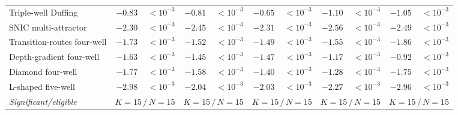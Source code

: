 \begin{tabular}{@{}l rr rr rr rr rr@{}}
Triple-well Duffing & $\mathbf{-0.83}$ & $<\!10^{-3}$ & $\mathbf{-0.81}$ & $<\!10^{-3}$ & $\mathbf{-0.65}$ & $<\!10^{-3}$ & $\mathbf{-1.10}$ & $<\!10^{-3}$ & $\mathbf{-1.05}$ & $<\!10^{-3}$ \\
SNIC multi-attractor & $\mathbf{-2.30}$ & $<\!10^{-3}$ & $\mathbf{-2.45}$ & $<\!10^{-3}$ & $\mathbf{-2.31}$ & $<\!10^{-3}$ & $\mathbf{-2.56}$ & $<\!10^{-3}$ & $\mathbf{-2.49}$ & $<\!10^{-3}$ \\
Transition-routes four-well & $\mathbf{-1.73}$ & $<\!10^{-3}$ & $\mathbf{-1.52}$ & $<\!10^{-3}$ & $\mathbf{-1.49}$ & $<\!10^{-3}$ & $\mathbf{-1.55}$ & $<\!10^{-3}$ & $\mathbf{-1.86}$ & $<\!10^{-3}$ \\
Depth-gradient four-well & $\mathbf{-1.63}$ & $<\!10^{-3}$ & $\mathbf{-1.45}$ & $<\!10^{-3}$ & $\mathbf{-1.47}$ & $<\!10^{-3}$ & $\mathbf{-1.17}$ & $<\!10^{-3}$ & $\mathbf{-0.92}$ & $<\!10^{-3}$ \\
Diamond four-well & $\mathbf{-1.77}$ & $<\!10^{-3}$ & $\mathbf{-1.58}$ & $<\!10^{-3}$ & $\mathbf{-1.40}$ & $<\!10^{-3}$ & $\mathbf{-1.28}$ & $<\!10^{-3}$ & $\mathbf{-1.75}$ & $<\!10^{-3}$ \\
L-shaped five-well & $\mathbf{-2.98}$ & $<\!10^{-3}$ & $\mathbf{-2.04}$ & $<\!10^{-3}$ & $\mathbf{-2.03}$ & $<\!10^{-3}$ & $\mathbf{-2.27}$ & $<\!10^{-3}$ & $\mathbf{-2.96}$ & $<\!10^{-3}$ \\
\midrule
\emph{Significant/eligible} & \multicolumn{2}{c}{$K{=}15\,/\,N{=}15$} & \multicolumn{2}{c}{$K{=}15\,/\,N{=}15$} & \multicolumn{2}{c}{$K{=}15\,/\,N{=}15$} & \multicolumn{2}{c}{$K{=}15\,/\,N{=}15$} & \multicolumn{2}{c}{$K{=}15\,/\,N{=}15$} \\
\bottomrule
\end{tabular}
